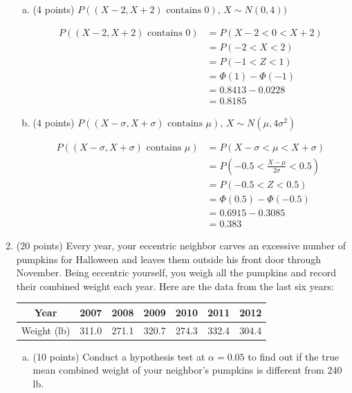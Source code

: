 \documentclass{article}\usepackage{graphicx, color}
\numberwithin{equation}{section}
\begin{document}
\begin{flushleft}
\begin{enumerate}[1. ]
\begin{enumerate}[a. ]
\item (4 points) $P((X - 2, X + 2) \text{ contains } 0)$, $X \sim N(0, 4))$

{\color{red}
\begin{align*}
P((X - 2, X + 2) \text{ contains } 0) &= P(X -2 < 0 < X + 2) \\
&= P(-2 < X < 2) \\
&= P(-1 < Z < 1) \\
&= \Phi(1) - \Phi(-1) \\
&= 0.8413 - 0.0228 \\
&= 0.8185
\end{align*}
}


\item (4 points) $P((X - \sigma, X + \sigma) \text{ contains } \mu)$, $X \sim N(\mu, 4 \sigma^2)$

{\color{red}
\begin{align*}
P((X -  \sigma, X + \sigma) \text{ contains } \mu) &= P(X - \sigma < \mu < X + \sigma ) \\
&= P(-0.5 < \frac{X - \mu}{2\sigma} < 0.5) \\
&= P(-0.5 < Z < 0.5) \\
&= \Phi(0.5) - \Phi(-0.5) \\
&= 0.6915 - 0.3085 \\
&= 0.383
\end{align*}}


\end{enumerate}


\item (20 points) Every year, your eccentric neighbor carves an excessive number of pumpkins for Halloween and leaves them outside his front door through November. Being eccentric yourself, you weigh all the pumpkins and record their combined weight each year. Here are the data from the last six years: 

\begin{center}
\begin{tabular}{c|cccccc}
Year & 2007 & 2008 & 2009 & 2010 & 2011 & 2012 \\ \hline
Weight (lb) & 311.0 & 271.1 & 320.7 & 274.3 & 332.4 & 304.4   \\ 
\end{tabular}
\end{center}

\begin{enumerate}[a. ]
\item (10 points) Conduct a hypothesis test at $\alpha = 0.05$ to find out if the true mean combined weight of your neighbor's pumpkins is different from 240 lb.


\end{enumerate}
\end{enumerate}
\end{flushleft}
\end{document}
